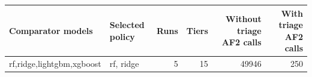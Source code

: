 \begin{tabular}{llrrrr}
\toprule
Comparator models & Selected policy & Runs & Tiers & Without triage AF2 calls & With triage AF2 calls \\
\midrule
rf,ridge,lightgbm,xgboost & rf, ridge & 5 & 15 & 49946 & 250 \\
\bottomrule
\end{tabular}

